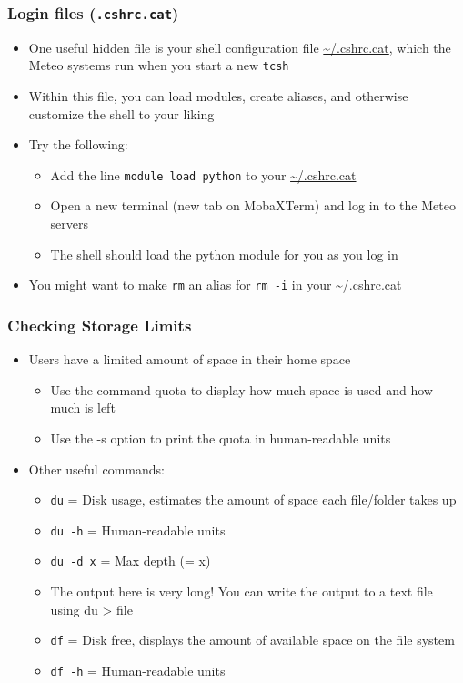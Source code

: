 \documentclass[hyperref,pdfa,unicode,utf8,usepdftitle]{beamer}
\begin{document}
\begin{frame}
  \frametitle{Login files (\texttt{.cshrc.cat})}
  \begin{itemize}
  \item One useful hidden file is your shell configuration
    file \url{~/.cshrc.cat}, which the Meteo systems run when
    you start a new \lstinline{tcsh}
  \item Within this file, you can load modules, create aliases, and
    otherwise customize the shell to your liking
  \item Try the following:
    \begin{itemize}
    \item Add the line \lstinline{module load python} to
      your \url{~/.cshrc.cat}
    \item Open a new terminal (new tab on MobaXTerm) and log in to the
      Meteo servers
    \item The shell should load the python module for you as you log in
    \end{itemize}
  \item You might want to make \lstinline{rm} an alias
    for \lstinline{rm -i} in your \url{~/.cshrc.cat}
  \end{itemize}
\end{frame}

\begin{frame}
  \frametitle{Checking Storage Limits}
  \begin{itemize}
  \item Users have a limited amount of space in their home space
    \begin{itemize}
    \item Use the command quota to display how much space is used and
      how much is left
    \item Use the -s option to print the quota in human-readable units
    \end{itemize}
  \item Other useful commands:
    \begin{itemize}
    \item \lstinline{du} = Disk usage, estimates the amount of space each
      file/folder takes up
    \item \lstinline{du -h} = Human-readable units
    \item \lstinline{du -d x} = Max depth (= x)
    \item The output here is very long! You can write the output to
      a text file using du > file
    \item \lstinline{df} = Disk free, displays the amount of available space on
      the file system
    \item \lstinline{df -h} = Human-readable units
    \end{itemize}
  \end{itemize}
\end{frame}
\end{document}
